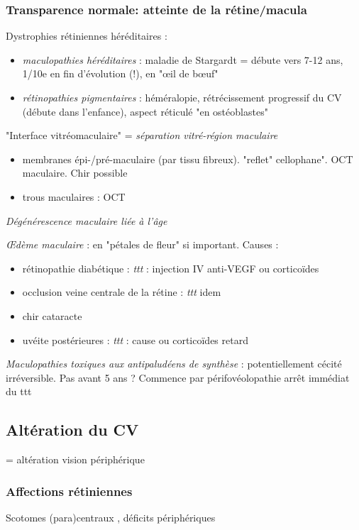 \documentclass[11pt]{article}
\begin{document}
\subsubsection{Transparence normale: atteinte de la rétine/macula}
\label{sec:org6984df6}
Dystrophies rétiniennes héréditaires :
\begin{itemize}
\item \emph{maculopathies héréditaires} : maladie de Stargardt = débute vers 7-12 ans,
1/10e en fin d'évolution (!), en "\oe{}il de b\oe{}uf"
\item \emph{rétinopathies pigmentaires} : héméralopie, rétrécissement progressif du CV
(débute dans l'enfance), aspect réticulé "en ostéoblastes"
\end{itemize}
"Interface vitréomaculaire" = \emph{séparation vitré-région maculaire}
\begin{itemize}
\item membranes épi-/pré-maculaire (par tissu fibreux). "reflet" cellophane". OCT
maculaire. Chir possible
\item trous maculaires : OCT
\end{itemize}
\emph{Dégénérescence maculaire liée à l'âge}

\emph{\OE{}dème maculaire} : en "pétales de fleur" si important. Causes : 
\begin{itemize}
\item rétinopathie diabétique : \emph{ttt} : injection IV anti-VEGF ou corticoïdes
\item occlusion veine centrale de la rétine : \emph{ttt} idem
\item chir cataracte
\item uvéite postérieures : \emph{ttt} : cause ou corticoïdes retard
\end{itemize}

\emph{Maculopathies toxiques aux antipaludéens de synthèse} : potentiellement cécité
irréversible. Pas avant 5 ans ? Commence par périfovéolopathie \thus arrêt
immédiat du ttt \danger

\subsection{Altération du CV}
\label{sec:org0ef0e97}
= altération vision périphérique

\subsubsection{Affections rétiniennes}
\label{sec:orgb34fac9}
Scotomes (para)centraux , déficits périphériques
\end{document}
